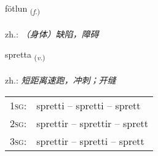 \documentclass[frontgrid, backgrid]{flacards}\usepackage[]{graphicx}\usepackage[]{xcolor}
\begin{document}
\renewcommand{\blhead}{\vskip5pt {\small\bfseries\footnotesize Nafnorð | 名词 }}
\renewcommand{\bcfoot}{\vskip5pt \hspace{2pt}{\small\bfseries\footnotesize 3K}}


{fötlun \small{\textsubscript{(\textit{f.})}} \\[1ex] %
\textphonetic{[fœhtlʏn]} \\
zh.: \emph{（身体）缺陷，障碍} \\  [2ex]
\renewcommand*{\arraystretch}{0.8}
}

\renewcommand{\flhead}{\vskip5pt \fboxsep=0pt {\small\bfseries\footnotesize Sagnorð | 动词}}
\renewcommand{\fcfoot}{\vskip5pt \fboxsep=0pt \hspace{2pt}{\small\bfseries\footnotesize 3K}}

\renewcommand{\blhead}{\vskip5pt {\small\bfseries\footnotesize Sagnorð | 动词 }}
\renewcommand{\bcfoot}{\vskip5pt \hspace{2pt}{\small\bfseries\footnotesize 3K}}


{spretta \small{\textsubscript{(\textit{v.})}} \\[1ex] %
\textphonetic{[sprɛhta]} \\
zh.: \emph{短距离速跑，冲刺；开缝} \\  [2ex]
\renewcommand*{\arraystretch}{0.8}
\begin{tabular}{p{1cm}l}
\textsc{1sg}: & spretti -- spretti -- sprett \\ 
\textsc{2sg}: & sprettir -- sprettir -- sprett \\ 
\textsc{3sg}: & sprettir -- spretti -- sprett \\ 
\end{tabular}
}
\end{document}
